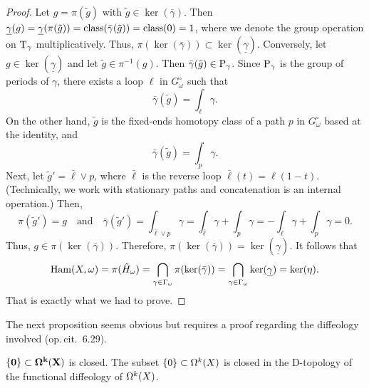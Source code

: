 \begin{proof}
  Let $g = \pi(\tilde g)$ with $\tilde g \in \ker(\bar\gamma)$.
  Then $\underline \gamma(g) = \underline \gamma(\pi(\tilde g)) = \operatorname{class}(\bar \gamma(\tilde g)) = \operatorname{class}(0) = 1$,
  where we denote the group operation on $\mathrm{T}_\gamma$ multiplicatively.
  Thus,
  $\pi(\ker(\bar \gamma)) \subset \ker(\underline \gamma)$.
  Conversely,
  let $g \in \ker(\underline\gamma)$ and let $\tilde g \in \pi^{-1}(g)$.
  Then $\bar\gamma(\tilde g) \in \operatorname{P}_\gamma$.
  Since $\operatorname{P}_\gamma$ is the group of periods of $\gamma$,
  there exists a loop $\ell$ in $G_\omega^\circ$ such that
  $$
    \bar\gamma(\tilde g) = \int_\ell \gamma.
  $$
  On the other hand,
  $\tilde g$ is the fixed-ends homotopy class of a path $p$ in $G_\omega^\circ$ based at the identity,
  and
  $$
    \bar\gamma(\tilde g) = \int_p \gamma.
  $$
  Next,
  let $\tilde g' = \bar\ell \vee p$,
  where $\bar\ell$ is the reverse loop $\bar\ell(t) = \ell(1-t)$.
  (Technically,
  we work with stationary paths and concatenation is an internal operation.)
  Then,
  $$
    \pi(\tilde g') = g
    \quad \text{and} \quad
    \bar\gamma(\tilde g') = \int_{\bar\ell \vee p} \gamma
    = \int_{\bar\ell} \gamma + \int_p \gamma
    = -\int_\ell \gamma + \int_p \gamma
    = 0.
  $$
  Thus,
  $g \in \pi(\ker(\bar\gamma))$.
  Therefore,
  $\pi(\ker(\bar\gamma)) = \ker(\underline\gamma)$.
  It follows that
  $$
    \operatorname{Ham}(X,\omega) = \pi(\hat H_\omega) = \bigcap_{\gamma \in \Gamma_\omega} \pi(\mathrm{ker}(\bar\gamma))
    = \bigcap_{\gamma \in \Gamma_\omega} \mathrm{ker}(\underline\gamma) = \mathrm{ker}(\eta).
  $$
That is exactly what we had to prove.
\end{proof}

The next proposition seems obvious but requires a proof regarding the diffeology involved (op.\,cit. \textsection\,6.29).

\begin{Article}{$\mathbf{\{0\} \subset \Omega^k(X)}$ is closed.}{}
  The subset $\{0\} \subset \Omega^k(X)$ is closed in the D-topology of the functional diffeology of $\Omega^k(X)$.
\end{Article}

